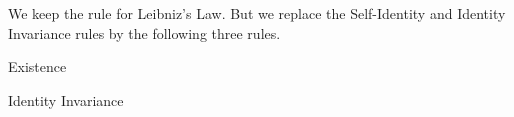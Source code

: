 

\bigskip

We keep the rule for Leibniz's Law. But we replace the Self-Identity and Identity Invariance rules by the following three rules.

\bigskip

\begin{minipage}{0.32\textwidth}\centering
    Existence
    
\end{minipage}
\begin{minipage}{0.32\textwidth}\centering
    Identity Invariance
    
    \bigskip
\end{minipage}
\begin{minipage}{0.32\textwidth}\centering
{}
\end{minipage}

